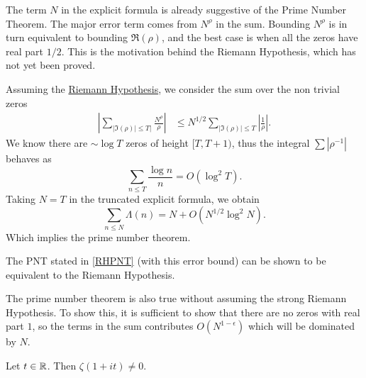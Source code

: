 The term $N$ in the explicit formula is already suggestive of the Prime Number Theorem. 
The major error term comes from $N^\rho$ in the sum.  
Bounding $N^{\rho}$ is in turn equivalent to bounding $\Re({\rho})$, and the best case is when all the zeros have real part $1/2$. This is the motivation behind the Riemann Hypothesis, which has not yet been proved. 

Assuming the \hyperref[RH]{Riemann Hypothesis}, we consider the sum over the non trivial zeros \begin{align*}
\left|\sum_{|\Im(\rho)|\leq T|}\frac{N^\rho}{\rho}\right| &\leq N^{1/2} \sum_{|\Im(\rho)|\leq T}\left|{\frac{1}{\rho}}\right|.    
\end{align*}
We know there are $\sim \log T$ zeros of height $[T,T+1)$, thus the integral $\sum |\rho^{-1}|$ behaves as \[
\sum_{n\leq T} \frac{\log n}{n} = O(\log^2 T).
\]
Taking $N=T$ in the truncated explicit formula, we obtain \begin{equation} \label{RHPNT}
    \sum_{n\leq N} \Lambda(n) = N + O(N^{1/2}\log^2 N).
\end{equation}
Which implies the prime number theorem.
\begin{remark}
    The PNT stated in \ref{RHPNT} (with this error bound) can be shown to be equivalent to the Riemann Hypothesis.
\end{remark}
The prime number theorem is also true without assuming the strong Riemann Hypothesis. 
To show this, it is sufficient to show that there are no zeros with real part $1$, so the terms in the sum contributes $O(N^{1-\epsilon})$
which will be dominated by $N$.
\begin{theorem}\label{nozerosatone}
    Let $t\in\mathbb{R}$. Then $\zeta(1+it)\neq 0$.
\end{theorem}

